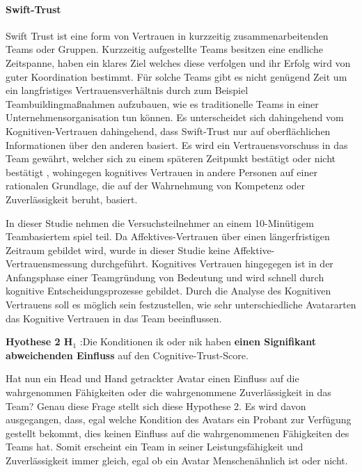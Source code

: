 \documentclass[a4paper,11pt]{article}%
\renewcommand{\\}{\vspace*{0.5\baselineskip} \newline}
\begin{document}
	\paragraph{Swift-Trust}
Swift Trust ist eine form von Vertrauen in kurzzeitig zusammenarbeitenden Teams oder Gruppen. Kurzzeitig aufgestellte Teams besitzen eine endliche Zeitspanne, haben ein klares Ziel welches diese verfolgen und ihr Erfolg wird von guter Koordination bestimmt.
Für solche Teams gibt es nicht genügend Zeit um ein langfristiges Vertrauensverhältnis durch zum Beispiel Teambuildingmaßnahmen aufzubauen, wie es traditionelle Teams in einer Unternehmensorganisation tun können.
Es unterscheidet sich dahingehend vom Kognitiven-Vertrauen dahingehend, dass Swift-Trust nur auf oberflächlichen Informationen über den anderen basiert. Es wird ein Vertrauensvorschuss in das Team gewährt, welcher sich zu einem späteren Zeitpunkt bestätigt oder nicht bestätigt \citep[p.141]{wildman2012trust}, wohingegen kognitives Vertrauen in andere Personen auf einer rationalen Grundlage, die auf der Wahrnehmung von Kompetenz oder Zuverlässigkeit beruht, basiert. \citep[p.970]{lewis1985trust}

In dieser Studie nehmen die Versuchsteilnehmer an einem 10-Minütigem Teambasiertem spiel teil. Da Affektives-Vertrauen über einen längerfristigen Zeitraum gebildet wird, wurde in dieser Studie keine Affektive-Vertrauensmessung durchgeführt. Kognitives Vertrauen hingegegen ist in der Anfangsphase einer Teamgründung von Bedeutung und wird schnell durch kognitive Entscheidungsprozesse gebildet. Durch die Analyse des Kognitiven Vertrauens soll es möglich sein festzustellen, wie sehr unterschiedliche Avatararten das Kognitive Vertrauen in das Team beeinflussen.

\textbf{Hyothese 2 H$_{1}$} :Die Konditionen \ac{ik} oder \ac{nik} haben \textbf{einen Signifikant abweichenden Einfluss} auf den Cognitive-Trust-Score. \newline

Hat nun ein Head und Hand getrackter Avatar einen Einfluss auf die wahrgenommen Fähigkeiten oder die wahrgenommene Zuverlässigkeit in das Team? Genau diese Frage stellt sich diese Hypothese 2.
Es wird davon ausgegangen, dass, egal welche Kondition des Avatars ein Probant zur Verfügung gestellt bekommt, dies keinen Einfluss auf die wahrgenommenen Fähigkeiten des Teams hat. Somit erscheint ein Team in seiner Leistungsfähigkeit und Zuverlässigkeit immer gleich, egal ob ein Avatar Menschenähnlich ist oder nicht.
\end{document}
